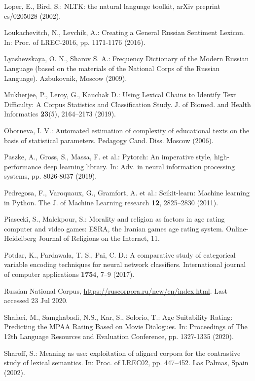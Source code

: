 \documentclass[runningheads]{llncs}
\begin{document}
\begin{thebibliography}{37}
Loper, E., Bird, S.: NLTK: the natural language toolkit, arXiv preprint cs/0205028 (2002).

Loukachevitch, N., Levchik, A.: Creating a General Russian Sentiment Lexicon. In: Proc. of LREC-2016, pp. 1171-1176 (2016).

Lyashevskaya, O. N., Sharov S. A.: Frequency Dictionary of the Modern Russian Language (based on the materials of the National Corps of the Russian Language). Azbukovnik, Moscow (2009).

Mukherjee, P., Leroy, G., Kauchak D.: Using Lexical Chains to Identify Text Difficulty: A Corpus Statistics and Classification Study. J. of Biomed. and Health Informatics \textbf{23}(5), 2164--2173 (2019). 

Oborneva, I. V.: Automated estimation of complexity of educational texts on the basis of statistical parameters. Pedagogy Cand. Diss. Moscow (2006).

Paszke, A., Gross, S., Massa, F. et al.: Pytorch: An imperative style, high-performance deep learning library. In: Adv. in neural information processing systems, pp. 8026-8037 (2019).

Pedregosa, F., Varoquaux, G., Gramfort, A. et al.: Scikit-learn: Machine learning in Python. The J. of Machine Learning research \textbf{12}, 2825--2830 (2011).

Piasecki, S., Malekpour, S.: Morality and religion as factors in age rating computer and video games: ESRA, the Iranian games age rating system. Online-Heidelberg Journal of Religions on the Internet, 11.

Potdar, K., Pardawala, T. S., Pai, C. D.: A comparative study of categorical variable encoding techniques for neural network classifiers. International journal of computer applications \textbf{175}4, 7--9 (2017). 

Russian National Corpus, \url{https://ruscorpora.ru/new/en/index.html}. Last accessed 23 Jul 2020.

Shafaei, M., Samghabadi, N.S., Kar, S., Solorio, T.: Age Suitability Rating: Predicting the MPAA Rating Based on Movie Dialogues. In: Proceedings of The 12th Language Resources and Evaluation Conference, pp. 1327-1335 (2020).

Sharoff, S.: Meaning as use: exploitation of aligned corpora for the contrastive study of lexical semantics. In: Proc. of LREC02, pp. 447--452. Las Palmas, Spain (2002).


\end{thebibliography}
\end{document}
